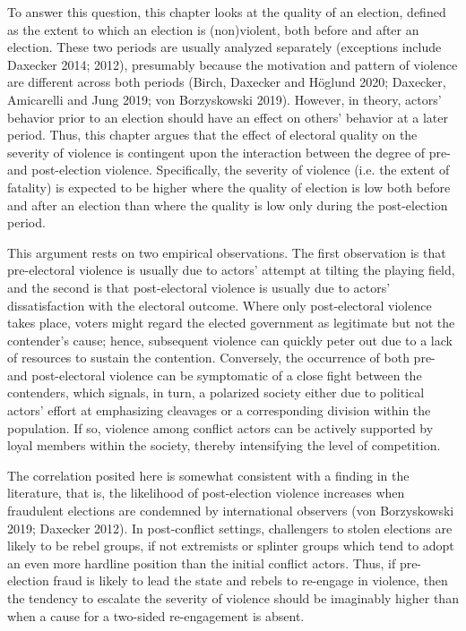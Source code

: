 \documentclass [11pt]{article}
\begin{document}
To answer this question, this chapter looks at the quality of an election, defined as the extent to which an election is (non)violent, both before and after an election. These two periods are usually analyzed separately (exceptions include Daxecker 2014; 2012), presumably because the motivation and pattern of violence are different across both periods (Birch, Daxecker and Höglund 2020; Daxecker, Amicarelli and Jung 2019; von Borzyskowski 2019). However, in theory, actors' behavior prior to an election should have an effect on others' behavior at a later period. Thus, this chapter argues that the effect of electoral quality on the severity of violence is contingent upon the interaction between the degree of pre- and post-election violence. Specifically, the severity of violence (i.e. the extent of fatality) is expected to be higher where the quality of election is low both before and after an election than where the quality is low only during the post-election period.

This argument rests on two empirical observations. The first observation is that pre-electoral violence is usually due to actors' attempt at tilting the playing field, and the second is that post-electoral violence is usually due to actors' dissatisfaction with the electoral outcome. Where only post-electoral violence takes place, voters might regard the elected government as legitimate but not the contender's cause; hence, subsequent violence can quickly peter out due to a lack of resources to sustain the contention. Conversely, the occurrence of both pre- and post-electoral violence can be symptomatic of a close fight between the contenders, which signals, in turn, a polarized society either due to political actors' effort at emphasizing cleavages or a corresponding division within the population. If so, violence among conflict actors can be actively supported by loyal members within the society, thereby intensifying the level of competition. 

The correlation posited here is somewhat consistent with a finding in the literature, that is, the likelihood of post-election violence increases when fraudulent elections are condemned by international observers (von Borzyskowski 2019; Daxecker 2012). In post-conflict settings, challengers to stolen elections are likely to be rebel groups, if not extremists or splinter groups which tend to adopt an even more hardline position than the initial conflict actors. Thus, if pre-election fraud is likely to lead the state and rebels to re-engage in violence, then the tendency to escalate the severity of violence should be imaginably higher than when a cause for a two-sided re-engagement is absent.
\end{document}
